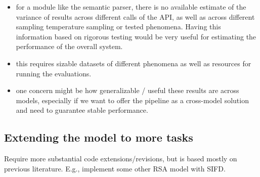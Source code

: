 \documentclass[fleqn,reqno,10pt]{article}
\begin{document}
\begin{enumerate}
  \begin{itemize}
    \item for a module like the semantic parser, there is no available estimate of the variance of results across different calls of the API, as well as across different sampling temperature sampling or tested phenomena. Having this information based on rigorous testing would be very useful for estimating the performance of the overall system.
    \item this requires sizable datasets of different phenomena as well as resources for running the evaluations.
    \item one concern might be how generalizable / useful these results are across models, especially if we want to offer the pipeline as a cross-model solution and need to guarantee stable performance.
  \end{itemize}
\end{enumerate}

\subsection{Extending the model to more tasks}

Require more substantial code extensions/revisions, but is based mostly on previous literature. E.g., implement some other RSA model with SIFD.
\end{document}
